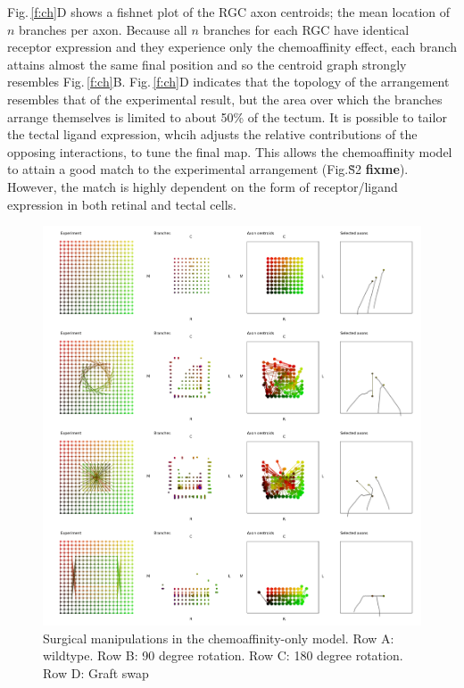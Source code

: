 \documentclass[11pt, a4paper]{article}
\begin{document}
Fig.\,\ref{f:ch}D shows a fishnet plot of the RGC axon centroids; the mean
location of $n$ branches per axon. Because all $n$ branches for each RGC have
identical receptor expression and they experience only the chemoaffinity
effect, each branch attains almost the same final position and so the centroid
graph strongly resembles Fig.\,\ref{f:ch}B. Fig.\,\ref{f:ch}D indicates that
the topology of the arrangement resembles that of the experimental result, but
the area over which the branches arrange themselves is limited to about 50\%
of the tectum. It is possible to tailor the tectal ligand expression, whcih
adjusts the relative contributions of the opposing interactions, to tune the
final map. This allows the chemoaffinity model to attain a good match to the
experimental arrangement (Fig.\~S2 \textbf{fixme}). However, the match is
highly dependent on the form of receptor/ligand expression in both retinal and
tectal cells.

\begin{figure}
\includegraphics[width=\linewidth]{./images/fig_chemo_manipulations.png}
\caption{Surgical manipulations in the chemoaffinity-only model. Row A: wildtype. Row B: 90 degree
rotation. Row C: 180 degree rotation. Row D: Graft swap}
\label{f:chemosurg}
\end{figure}
\end{document}

